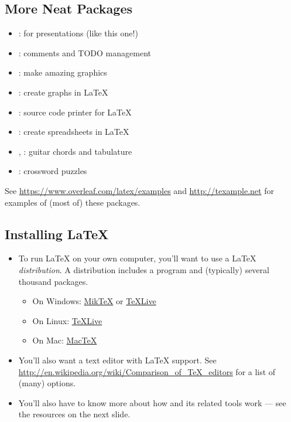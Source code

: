 \documentclass[aspectratio=169]{beamer}
\begin{document}
\subsection{More Neat Packages}
\begin{frame}{\insertsubsection}
\begin{itemize}
\item {}: for presentations (like this one!)
\item {}: comments and TODO management
\item {}: make amazing graphics
\item {}: create graphs in \LaTeX
\item {}: source code printer for \LaTeX
\item {}: create spreadsheets in \LaTeX
\item {}, : guitar chords and tabulature
\item {}: crossword puzzles
\end{itemize}
See \url{https://www.overleaf.com/latex/examples} and \url{http://texample.net}
for examples of (most of) these packages.
\end{frame}

\subsection{Installing \LaTeX{}}
\begin{frame}{\insertsubsection}
\begin{itemize}
\item To run \LaTeX{} on your own computer, you'll want to use a \LaTeX{}
\emph{distribution}. A distribution includes a  program
and (typically) several thousand packages.
\begin{itemize}
\item On Windows: \href{http://miktex.org/}{Mik\TeX} or \href{http://tug.org/texlive/}{\TeX Live}
\item On Linux: \href{http://tug.org/texlive/}{\TeX Live}
\item On Mac: \href{http://tug.org/mactex/}{Mac\TeX}
\end{itemize}
\item You'll also want a text editor with \LaTeX{} support. See \url{http://en.wikipedia.org/wiki/Comparison_of_TeX_editors} for a list of (many) options.
\item You'll also have to know more about how  and its related tools
work --- see the resources on the next slide.
\end{itemize}
\end{frame}
\end{document}
